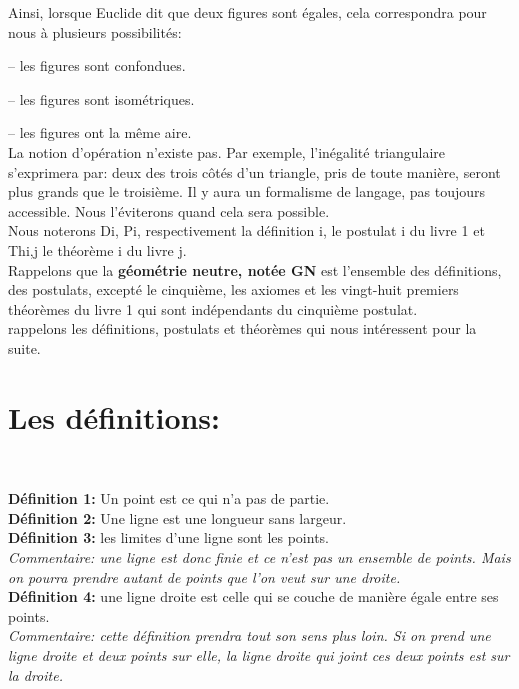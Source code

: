 \documentclass[a4paper, 12pt, twoside]{book}
\begin{document}
Ainsi, lorsque Euclide dit que deux figures sont égales, cela correspondra pour nous à plusieurs possibilités:\

-- les figures sont confondues.\

-- les figures sont isométriques.\

-- les figures ont la même aire. \\

La notion d'opération n'existe pas. Par exemple, l'inégalité triangulaire s'exprimera par: deux des trois côtés d'un triangle, pris de toute manière, seront plus grands que le troisième. Il y aura un formalisme de langage, pas toujours accessible. Nous l'éviterons quand cela sera possible.\\

Nous noterons Di, Pi, respectivement la définition i, le postulat i du livre 1 et Thi,j le théorème i du livre j.\\

Rappelons que la \textbf{géométrie neutre, notée GN} est l'ensemble des définitions, des postulats, excepté le cinquième,  les axiomes et les vingt-huit premiers théorèmes du livre 1 qui sont indépendants du cinquième postulat.\\

 rappelons les définitions, postulats et théorèmes qui nous intéressent pour la suite.


\section{Les définitions:}\

\textbf{Définition 1:} Un  point est ce qui n'a pas de partie.\\

\textbf{Définition 2:} Une ligne est une longueur sans largeur.\\

\textbf{Définition 3:} les limites d'une ligne sont les points.\\

\textit{Commentaire: une ligne est donc finie et ce n'est pas un ensemble de points. Mais on pourra prendre autant de points que l'on veut sur une droite.}\\

\textbf{Définition 4:} une ligne droite est celle qui se couche de manière égale entre ses points.\\

\textit{Commentaire: cette définition prendra tout son sens plus loin. Si on prend une ligne droite et deux points sur elle, la ligne droite qui joint ces deux points est sur la droite.}\\
\end{document}
